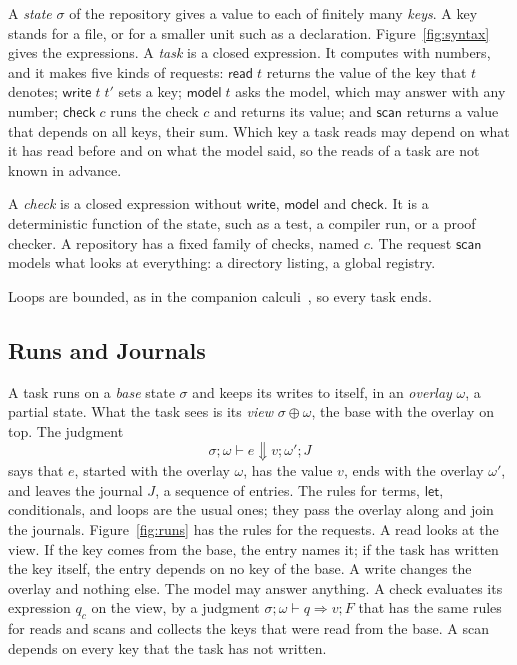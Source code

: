 \documentclass[acmsmall,nonacm,screen]{acmart}
\newcommand{\kw}[1]{\mathsf{#1}}
\newcommand{\rd}[1]{\kw{read}\;#1}
\newcommand{\wrt}[2]{\kw{write}\;#1\;#2}
\newcommand{\mdl}[1]{\kw{model}\;#1}
\newcommand{\chk}[1]{\kw{check}\;#1}
\newcommand{\scan}{\kw{scan}}
\newcommand{\evto}{\Downarrow}
\newcommand{\upd}{\oplus}
\begin{document}
A \emph{state} $\sigma$ of the repository gives a value to each of finitely many
\emph{keys}. A key stands for a file, or for a smaller unit such as a declaration.
Figure~\ref{fig:syntax} gives the expressions. A \emph{task} is a closed expression. It
computes with numbers, and it makes five kinds of requests: $\rd{t}$ returns the value of the
key that $t$ denotes; $\wrt{t}{t'}$ sets a key; $\mdl{t}$ asks the model, which may answer
with any number; $\chk{c}$ runs the check $c$ and returns its value; and $\scan$ returns a
value that depends on all keys, their sum. Which key a task reads may depend on what it has
read before and on what the model said, so the reads of a task are not known in advance.

A \emph{check} is a closed expression without $\kw{write}$, $\kw{model}$ and $\kw{check}$. It
is a deterministic function of the state, such as a test, a compiler run, or a proof checker.
A repository has a fixed family of checks, named $c$. The request $\scan$ models what looks
at everything: a directory listing, a global registry.

Loops are bounded, as in the companion calculi~\citep{tpp8}, so every task ends.

\subsection{Runs and Journals}
\label{sec:runs}

A task runs on a \emph{base} state $\sigma$ and keeps its writes to itself, in an
\emph{overlay} $\omega$, a partial state. What the task sees is its \emph{view}
$\sigma \upd \omega$, the base with the overlay on top. The judgment
\[
\sigma; \omega \vdash e \evto v; \omega'; J
\]
says that $e$, started with the overlay $\omega$, has the value $v$, ends with the overlay
$\omega'$, and leaves the journal $J$, a sequence of entries. The rules for terms, $\kw{let}$,
conditionals, and loops are the usual ones; they pass the overlay along and join the
journals. Figure~\ref{fig:runs} has the rules for the requests. A read looks at the view. If
the key comes from the base, the entry names it; if the task has written the key itself, the
entry depends on no key of the base. A write changes the overlay and nothing else. The
model may answer anything. A check evaluates its expression $q_c$ on the view, by a judgment
$\sigma; \omega \vdash q \Rightarrow v; F$ that has the same rules for reads and scans and
collects the keys that were read from the base. A scan depends on every key that the task
has not written.
\end{document}
